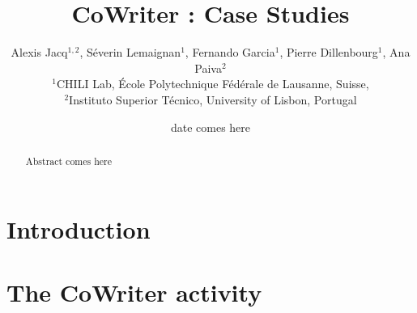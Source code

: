 \documentclass{sig-alternate}
\begin{document}

\title{CoWriter : Case Studies}


\author{Alexis Jacq$^{1,2}$, S\'everin Lemaignan$^1$, Fernando Garcia$^1$, Pierre Dillenbourg$^1$, Ana Paiva$^2$\\
$^1$CHILI Lab, \'Ecole Polytechnique F\'ed\'erale de Lausanne, Suisse,\\
$^2$Instituto Superior T\'{e}cnico, University of Lisbon, Portugal}


%
%


\date{date comes here}


\maketitle
\begin{abstract}
Abstract comes here
\end{abstract}


\section{Introduction}


\section{The CoWriter activity}
\end{document}
